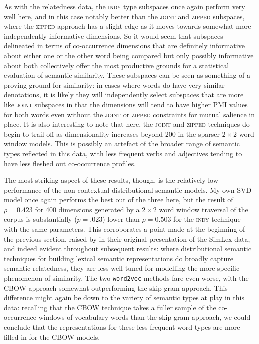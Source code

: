 As with the relatedness data, the \textsc{indy} type subspaces once again perform very well here, and in this case notably better than the \textsc{joint} and \textsc{zipped} subspaces, where the \textsc{zipped} approach has a slight edge as it moves towards somewhat more independently informative dimensions.  So it would seem that subspaces delineated in terms of co-occurrence dimensions that are definitely informative about either one or the other word being compared but only possibly informative about both collectively offer the most productive grounds for a statistical evaluation of semantic similarity.  These subspaces can be seen as something of a proving ground for similarity: in cases where words do have very similar denotations, it is likely they will independently select subspaces that are more like \textsc{joint} subspaces in that the dimensions will tend to have higher PMI values for both words even without the \textsc{joint} or \textsc{zipped} constraints for mutual salience in place.  It is also interesting to note that here, the \textsc{joint} and \textsc{zipped} techniques do begin to trail off as dimensionality increases beyond 200 in the sparser $2 \times 2$ word window models.  This is possibly an artefact of the broader range of semantic types reflected in this data, with less frequent verbs and adjectives tending to have less fleshed out co-occurrence profiles.

The most striking aspect of these results, though, is the relatively low performance of the non-contextual distributional semantic models.  My own SVD model once again performs the best out of the three here, but the result of $\rho = 0.423$ for 400 dimensions generated by a $2 \times 2$ word window traversal of the corpus is substantially ($p = .023$) lower than $\rho = 0.503$ for the \textsc{indy} technique with the same parameters.  This corroborates a point made at the beginning of the previous section, raised by \cite{HillEA2015} in their original presentation of the SimLex data, and indeed evident throughout subsequent results: where distributional semantic techniques for building lexical semantic representations do broadly capture semantic relatedness, they are less well tuned for modelling the more specific phenomenon of similarity.  The two \texttt{word2vec} methods fare even worse, with the CBOW approach somewhat outperforming the skip-gram approach.  This difference might again be down to the variety of semantic types at play in this data: recalling that the CBOW technique takes a fuller sample of the co-occurrence windows of vocabulary words than the skip-gram approach, we could conclude that the representations for these less frequent word types are more filled in for the CBOW models.

